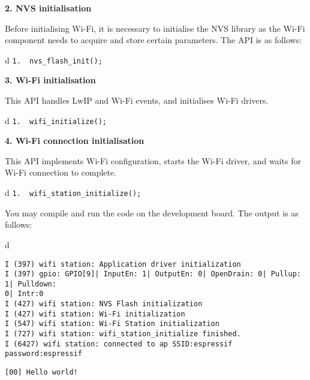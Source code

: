 \documentclass[a4paper,12pt]{book}
\begin{document}
\textbf{2. NVS initialisation}

Before initialising Wi-Fi, it is necessary to initialise the NVS library as the Wi-Fi component needs to acquire and store certain parameters. The API is as follows:

\begin{codebloc}
\begin{tabular}{d}
\verb|1.  nvs_flash_init();|
\end{tabular}
\end{codebloc}

\textbf{3. Wi-Fi initialisation}

This API handles LwIP and Wi-Fi events, and initialises Wi-Fi drivers.

\begin{codebloc}
\begin{tabular}{d}
\verb|1.  wifi_initialize();|
\end{tabular}
\end{codebloc}

\textbf{4. Wi-Fi connection initialisation}

This API implements Wi-Fi configuration, starts the Wi-Fi driver, and waits for Wi-Fi connection to complete.

\begin{codebloc}
\begin{tabular}{d}
\verb|1.  wifi_station_initialize();|
\end{tabular}
\end{codebloc}


You may compile and run the code on the development board. The output is as follows:

\begin{codebloc}
\fontsize{9.7pt}{9.7pt}\selectfont
\begin{tabular}{d}
\vspace{2pt}
\begin{verbatim}
I (397) wifi station: Application driver initialization
I (397) gpio: GPIO[9]| InputEn: 1| OutputEn: 0| OpenDrain: 0| Pullup: 1| Pulldown: 
0| Intr:0
I (427) wifi station: NVS Flash initialization
I (427) wifi station: Wi-Fi initialization
I (547) wifi station: Wi-Fi Station initialization
I (727) wifi station: wifi_station_initialize finished.
I (6427) wifi station: connected to ap SSID:espressif password:espressif
\end{verbatim}
\verb|[00] Hello world!|
\end{tabular}
\end{codebloc}
\end{document}
